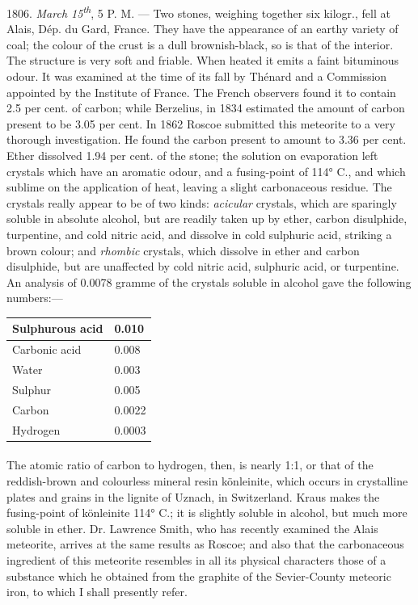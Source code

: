 \documentclass[a4paper, 11pt, oneside, english]{article}
\begin{document}
1806. \emph{March 15\textsuperscript{th}}, 5 P. M. --- Two stones, weighing together six kilogr., fell at Alais, Dép. du Gard, France. They have the appearance of an earthy variety of coal; the colour of the crust is a dull brownish-black, so is that of the interior. The structure is very soft and friable. When heated it emits a faint bituminous odour. It was examined at the time of its fall by Thénard and a Commission appointed by the Institute of France. The French observers found it to contain 2.5 per cent. of carbon; while Berzelius, in 1834 estimated the amount of carbon present to be 3.05 per cent. In 1862 Roscoe submitted this meteorite to a very thorough investigation. He found the carbon present to amount to 3.36 per cent. Ether dissolved 1.94 per cent. of the stone; the solution on evaporation left crystals which have an aromatic odour, and a fusing-point of 114° C., and which sublime on the application of heat, leaving a slight carbonaceous residue. The crystals really appear to be of two kinds: \emph{acicular} crystals, which are sparingly soluble in absolute alcohol, but are readily taken up by ether, carbon disulphide, turpentine, and cold nitric acid, and dissolve in cold sulphuric acid, striking a brown colour; and \emph{rhombic} crystals, which dissolve in ether and carbon disulphide, but are unaffected by cold nitric acid, sulphuric acid, or turpentine. An analysis of 0.0078 gramme of the crystals soluble in alcohol gave the following numbers:---
\begin{table}[H]
    \centering
    \begin{tabular}{|l|l|}
    \hline
        Sulphurous acid & 0.010 \\ \hline
        Carbonic acid & 0.008 \\ \hline
        Water & 0.003 \\ \hline
        Sulphur & 0.005 \\ \hline
        Carbon & 0.0022 \\ \hline
        Hydrogen & 0.0003 \\ \hline
    \end{tabular}
\end{table}
\paragraph{}
The atomic ratio of carbon to hydrogen, then, is nearly 1:1, or that of the reddish-brown and colourless mineral resin könleinite, which occurs in crystalline plates and grains in the lignite of Uznach, in Switzerland. Kraus makes the fusing-point of könleinite 114° C.; it is slightly soluble in alcohol, but much more soluble in ether. Dr. Lawrence Smith, who has recently examined the Alais meteorite, arrives at the same results as Roscoe; and also that the carbonaceous ingredient of this meteorite resembles in all its physical characters those of a substance which he obtained from the graphite of the Sevier-County meteoric iron, to which I shall presently refer.
\end{document}
